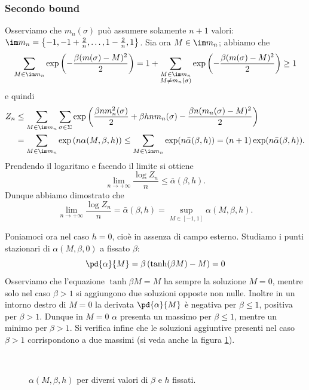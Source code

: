 \subsubsection{Secondo bound}
Osserviamo che $ m_n(\sigma) $ può assumere solamente $ n+1 $ valori: $ \im m_n = \left\{ -1, -1 + \frac{2}{n}, \ldots, 1-\frac{2}{n}, 1 \right\} $. Sia ora $ M \in \im m_n $; abbiamo che
\[ \sum_{M\in \im m_n} \exp\left( -\frac{\beta(m(\sigma)-M)^2}{2} \right) = 1 + \sum_{\substack{M \in \im m_n \\ M \neq m_n(\sigma)}} \exp\left( -\frac{\beta(m(\sigma)-M)^2}{2} \right) \geq 1 \]
e quindi
\begin{align*}
    Z_n & \leq \sum_{M\in \im m_n} \sum_{\sigma \in \Sigma} \exp\left( \frac{\beta n m_n^2(\sigma)}{2} + \beta h n m_n(\sigma) - \frac{\beta n (m_n(\sigma)-M)^2}{2}\right)     \\
        & = \sum_{M\in \im m_n} \exp\left( n \alpha(M, \beta, h) \right)
         \leq \sum_{M\in \im m_n} \exp(n \bar{\alpha}(\beta, h)) = (n+1) \exp(n \bar{\alpha}(\beta, h)).
\end{align*}
Prendendo il logaritmo e facendo il limite si ottiene
\[  \lim_{n \to +\infty} \frac{\log Z_n}{n} \leq \bar{\alpha}(\beta,h). \]
Dunque abbiamo dimostrato che
\[ \lim_{n \to +\infty}\frac{\log Z_n}{n} = \bar{\alpha}(\beta,h) = \sup_{M\in[-1,1]} \alpha(M, \beta, h). \]



Poniamoci ora nel caso $ h = 0 $, cioè in assenza di campo esterno. Studiamo i punti stazionari di $ \alpha(M, \beta, 0) $ a fissato $ \beta $:
\[ \pd{\alpha}{M} = \beta \left( \tanh(\beta M) - M \right) = 0 \]
Osserviamo che l'equazione $ \tanh{\beta M} = M $ ha sempre la soluzione $ M = 0 $, mentre solo nel caso $ \beta > 1 $ si aggiungono due soluzioni opposte non nulle. Inoltre in un intorno destro di $ M = 0 $ la derivata $ \pd{\alpha}{M} $ è negativa per $ \beta \leq 1 $, positiva per $ \beta > 1 $. Dunque in $ M = 0 $ $ \alpha $ presenta un massimo per $ \beta \leq 1 $, mentre un minimo per $ \beta > 1 $. Si verifica infine che le soluzioni aggiuntive presenti nel caso $ \beta > 1 $ corrispondono a due massimi (si veda anche la figura \ref{fig:alpha}).

\iffigureon
\begin{figure}[h!]
    \centering
    \subfloat{}
    \subfloat{} \\
    \subfloat{}
    \subfloat{}
    \caption{$ \alpha(M,\beta,h) $ per diversi valori di $ \beta $ e $ h $ fissati.}
    \label{fig:alpha}
\end{figure}


